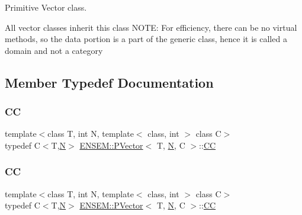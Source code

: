 Primitive Vector class. 

All vector classes inherit this class N\+O\+TE\+: For efficiency, there can be no virtual methods, so the data portion is a part of the generic class, hence it is called a domain and not a category 

\subsection{Member Typedef Documentation}
\mbox{\label{classENSEM_1_1PVector_a92dc0a0a301a3dc96f7be5d337019bc7}} 
\subsubsection{\texorpdfstring{CC}{CC}\hspace{0.1cm}{\footnotesize\ttfamily [1/2]}}
{\footnotesize\ttfamily template$<$class T, int N, template$<$ class, int $>$ class C$>$ \\
typedef C$<$T,\mbox{\hyperlink{operator__name__util_8cc_a7722c8ecbb62d99aee7ce68b1752f337}{N}}$>$ \mbox{\hyperlink{classENSEM_1_1PVector}{E\+N\+S\+E\+M\+::\+P\+Vector}}$<$ T, \mbox{\hyperlink{operator__name__util_8cc_a7722c8ecbb62d99aee7ce68b1752f337}{N}}, C $>$\+::\mbox{\hyperlink{classENSEM_1_1PVector_a92dc0a0a301a3dc96f7be5d337019bc7}{CC}}}

\mbox{\label{classENSEM_1_1PVector_a92dc0a0a301a3dc96f7be5d337019bc7}} 
\subsubsection{\texorpdfstring{CC}{CC}\hspace{0.1cm}{\footnotesize\ttfamily [2/2]}}
{\footnotesize\ttfamily template$<$class T, int N, template$<$ class, int $>$ class C$>$ \\
typedef C$<$T,\mbox{\hyperlink{operator__name__util_8cc_a7722c8ecbb62d99aee7ce68b1752f337}{N}}$>$ \mbox{\hyperlink{classENSEM_1_1PVector}{E\+N\+S\+E\+M\+::\+P\+Vector}}$<$ T, \mbox{\hyperlink{operator__name__util_8cc_a7722c8ecbb62d99aee7ce68b1752f337}{N}}, C $>$\+::\mbox{\hyperlink{classENSEM_1_1PVector_a92dc0a0a301a3dc96f7be5d337019bc7}{CC}}}



